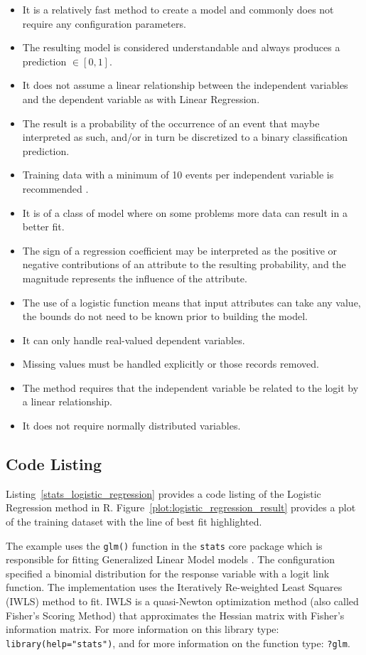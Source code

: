 \begin{itemize}
	\item It is a relatively fast method to create a model and commonly does not require any configuration parameters.
	\item The resulting model is considered understandable and always produces a prediction $\in[0,1]$.	
	\item It does not assume a linear relationship between the independent variables and the dependent variable as with Linear Regression. 
	\item The result is a probability of the occurrence of an event that maybe interpreted as such, and/or in turn be discretized to a binary classification prediction.
	\item Training data with a minimum of 10 events per independent variable is recommended \cite{Peduzzi1996}.
	\item It is of a class of model where on some problems more data can result in a better fit.
	\item The sign of a regression coefficient may be interpreted as the positive or negative contributions of an attribute to the resulting probability, and the magnitude represents the influence of the attribute.
	\item The use of a logistic function means that input attributes can take any value, the bounds do not need to be known prior to building the model.
	\item It can only handle real-valued dependent variables.
	\item Missing values must be handled explicitly or those records removed.
	\item The method requires that the independent variable be related to the logit by a linear relationship.
	\item It does not require normally distributed variables.	
\end{itemize}


\subsection{Code Listing}
Listing~\ref{stats_logistic_regression} provides a code listing of the Logistic Regression method in R. Figure~\ref{plot:logistic_regression_result} provides a plot of the training dataset with the line of best fit highlighted.

The example uses the \texttt{glm()} function in the \texttt{stats} core package which is responsible for fitting Generalized Linear Model models \cite{RDCT2011a}. The configuration specified a binomial distribution for the response variable with a logit link function. The implementation uses the Iteratively Re-weighted Least Squares (IWLS) method to fit. IWLS is a quasi-Newton optimization method (also called Fisher's Scoring Method) that approximates the Hessian matrix with Fisher's information matrix. For more information on this library type: \texttt{library(help="stats")}, and for more information on the function type: \texttt{?glm}.

